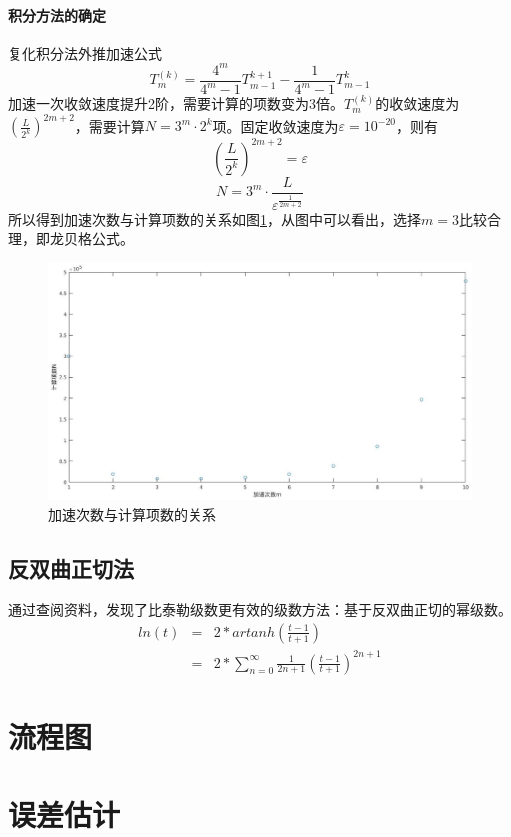 \documentclass[UTF8,twocolum,titlepage]{ctexart}
\begin{document}
\paragraph{积分方法的确定}
复化积分法外推加速公式\\
$$T_m^{(k)}=\frac{4^m}{4^m-1}T_{m-1}^{k+1}-\frac{1}{4^m-1}T_{m-1}^{k}$$
加速一次收敛速度提升2阶，需要计算的项数变为3倍。$T_m^{(k)}$的收敛速度为$\left(\frac{L}{2^k}\right)^{2m+2}$，需要计算$N=3^m\cdot2^k$项。固定收敛速度为$\varepsilon=10^{-20}$，则有$$\left(\frac{L}{2^k}\right)^{2m+2}=\varepsilon$$ $$N=3^m\cdot\frac{L}{\varepsilon^{\frac{1}{2m+2}}}$$所以得到加速次数与计算项数的关系如图\ref{fig:integration_m}，从图中可以看出，选择$m=3$比较合理，即龙贝格公式。
\begin{figure}[H]
\centering
\includegraphics[width = .9\textwidth]{image/integration_m.eps}
\caption{加速次数与计算项数的关系}
\label{fig:integration_m}
\end{figure}
\subsection*{反双曲正切法}
通过查阅资料，发现了比泰勒级数更有效\cite{Logarithm_Wikipedia}的级数方法：基于反双曲正切的幂级数。
\begin{eqnarray*}
ln\left(t\right) &=&2*artanh\left(\frac{t-1}{t+1}\right)\\&=&2*\sum_{n=0}^{\infty}\frac{1}{2n+1}\left(\frac{t-1}{t+1}\right)^{2n+1}
\end{eqnarray*}

\section*{流程图}

\section*{误差估计}
\end{document}
